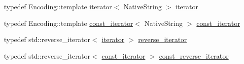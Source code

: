 {\bf }\par
\begin{DoxyCompactItemize}
\item 
typedef Encoding\+::template \hyperlink{classu5e_1_1basic__encodedstring_a6657b5ba8bb502ff86626bffe324aae6}{iterator}$<$ Native\+String $>$ \hyperlink{classu5e_1_1basic__encodedstring_a6657b5ba8bb502ff86626bffe324aae6}{iterator}
\item 
typedef Encoding\+::template \hyperlink{classu5e_1_1basic__encodedstring_a249da58e8bad9c91fab547516f90c60d}{const\+\_\+iterator}$<$ Native\+String $>$ \hyperlink{classu5e_1_1basic__encodedstring_a249da58e8bad9c91fab547516f90c60d}{const\+\_\+iterator}
\end{DoxyCompactItemize}

{\bf }\par
\begin{DoxyCompactItemize}
\item 
typedef std\+::reverse\+\_\+iterator$<$ \hyperlink{classu5e_1_1basic__encodedstring_a6657b5ba8bb502ff86626bffe324aae6}{iterator} $>$ \hyperlink{classu5e_1_1basic__encodedstring_ac41ff2456ae679490fffb9fa99cd01bb}{reverse\+\_\+iterator}
\item 
typedef std\+::reverse\+\_\+iterator$<$ \hyperlink{classu5e_1_1basic__encodedstring_a249da58e8bad9c91fab547516f90c60d}{const\+\_\+iterator} $>$ \hyperlink{classu5e_1_1basic__encodedstring_afaaf9b36cd1b6ad6821450e5445e32fd}{const\+\_\+reverse\+\_\+iterator}
\end{DoxyCompactItemize}

